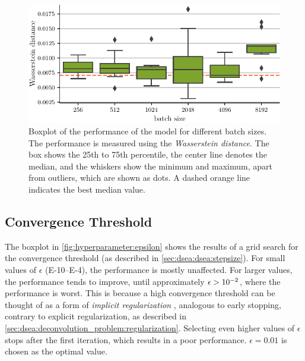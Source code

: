 \begin{figure}
  \centering
  \includegraphics[scale=1]{content/plots/hyperparam/batch_size_vs_wd_boxplot_lessheight.pdf}
  \caption{Boxplot of the performance of the model for different batch sizes.
    The performance is measured using the \emph{Wasserstein distance}.
    The box shows the 25th to 75th percentile,
    the center line denotes the median,
    and the whiskers show the minimum and maximum,
      apart from outliers,
        which are shown as dots.
    A dashed orange line indicates the best median value.
  }
  \label{fig:hyperparameter:batch_size}
\end{figure}


\subsection{Convergence Threshold}
The boxplot in \autoref{fig:hyperparameter:epsilon} shows the results of a grid search for the convergence threshold
  (as described in \autoref{sec:dsea:dsea:stepsize}).
For small values of $\epsilon$
  (\numrange{E-10}{E-4}),
the performance is mostly unaffected.
%
For larger values,
  the performance tends to improve,
  until approximately $\epsilon > \num{E-2}$,
  where the performance is worst.
This is because a high convergence threshold can be thought of as
  a form of \emph{implicit regularization} \citationneeded{},
    analogous to early stopping,
  contrary to explicit regularization,
    as described in \autoref{sec:dsea:deconvolution_problem:regularization}.
Selecting even higher values of $\epsilon$
stops \dsea{} after the first iteration,
  which results in a poor performance.
$\epsilon = \num{0.01}$ is chosen as the optimal value.


